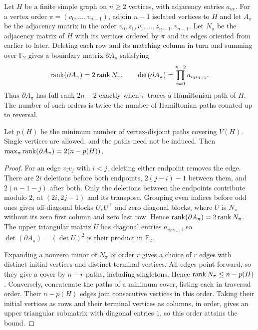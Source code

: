 \begin{samepage}
\begin{proposition}\label{prop:ordered-graph-ranks}
Let $H$ be a finite simple graph on $n\geq2$ vertices, with adjacency entries
$a_{uv}$. For a vertex order $\pi=(v_0,\ldots,v_{n-1})$, adjoin $n-1$ isolated
vertices to $H$ and let $A_\pi$ be the adjacency matrix in the order
$v_0,z_1,v_1,\ldots,z_{n-1},v_{n-1}$. Let $N_\pi$ be the adjacency matrix of $H$
with its vertices ordered by $\pi$ and its edges oriented from earlier to later.
Deleting each row and its matching column in turn and summing over $\mathbb F_2$
gives a boundary matrix $\partial A_\pi$ satisfying
\[
 \operatorname{rank}(\partial A_\pi)=2\operatorname{rank} N_\pi,\qquad
 \det(\partial A_\pi)=\prod_{i=0}^{n-2}a_{v_i v_{i+1}}.
\]
Thus $\partial A_\pi$ has full rank $2n-2$ exactly when $\pi$ traces a
Hamiltonian path of $H$. The number of such orders is twice the number
of Hamiltonian paths counted up to reversal.

Let $p(H)$ be the minimum number of vertex-disjoint paths covering $V(H)$.
Single vertices are allowed, and the paths need not be induced.
Then $\max_\pi\operatorname{rank}(\partial A_\pi)=2(n-p(H))$.
\end{proposition}
\end{samepage}
\begin{proof}
For an edge $v_iv_j$ with $i<j$, deleting either
endpoint removes the edge. There are $2i$ deletions before both endpoints,
$2(j-i)-1$ between them, and $2(n-1-j)$ after both.
Only the deletions between the endpoints contribute modulo $2$,
at $(2i,2j-1)$ and its transpose.
Grouping even indices before odd ones gives off-diagonal blocks $U,U^\top$
and zero diagonal blocks, where $U$ is $N_\pi$ without its zero first column
and zero last row. Hence $\operatorname{rank}(\partial A_\pi)=2\operatorname{rank} N_\pi$.
The upper triangular matrix $U$ has diagonal entries $a_{v_i v_{i+1}}$,
so $\det(\partial A_\pi)=(\det U)^2$ is their product in $\mathbb F_2$.

Expanding a nonzero minor of $N_\pi$ of order $r$ gives a choice of
$r$ edges with distinct initial vertices and distinct terminal
vertices. All edges point forward, so they give a cover by $n-r$ paths,
including singletons. Hence $\operatorname{rank} N_\pi\leq n-p(H)$. Conversely,
concatenate the paths of a minimum cover, listing each in traversal order.
Their $n-p(H)$ edges join consecutive vertices in this order. Taking
their initial vertices as rows and their terminal vertices as columns, in
order, gives an upper triangular submatrix with diagonal entries $1$,
so this order attains the bound.
\end{proof}

